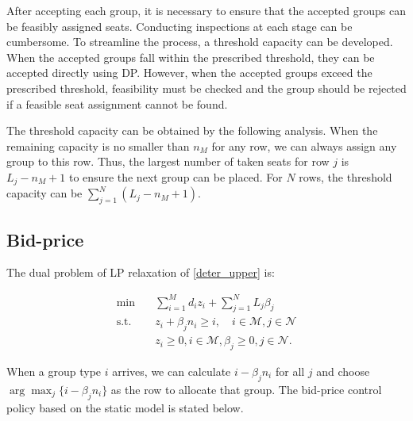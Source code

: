 



After accepting each group, it is necessary to ensure that the accepted groups can be feasibly assigned seats. Conducting inspections at each stage can be cumbersome. To streamline the process, a threshold capacity can be developed. When the accepted groups fall within the prescribed threshold, they can be accepted directly using DP. However, when the accepted groups exceed the prescribed threshold, feasibility must be checked and the group should be rejected if a feasible seat assignment cannot be found.


The threshold capacity can be obtained by the following analysis. When the remaining capacity is no smaller than $n_{M}$ for any row, we can always assign any group to this row. Thus, the largest number of taken seats for row $j$ is $L_j -n_{M} +1$ to ensure the next group can be placed. For $N$ rows, the threshold capacity can be $\sum_{j=1}^{N} (L_j -n_{M} +1)$.


\subsection{Bid-price}

The dual problem of LP relaxation of \eqref{deter_upper} is:

\begin{equation}\label{dual}
  \begin{aligned}
  \min \quad & \sum_{i=1}^{M} d_i z_i + \sum_{j= 1}^{N} L_j \beta_{j} \\
  \text {s.t.} \quad & z_{i} + \beta_j n_i \geq i, \quad i \in \mathcal{M}, j \in \mathcal{N} \\
  & z_{i} \geq 0, i \in \mathcal{M}, \beta_{j} \geq 0, j \in \mathcal{N}.
  \end{aligned}
\end{equation}

When a group type $i$ arrives, we can calculate $i -\beta_{j} n_i$ for all $j$ and choose $\arg \max_{j} \{i -\beta_{j} n_i\}$ as the row to allocate that group. The bid-price control policy based on the static model is stated below.

